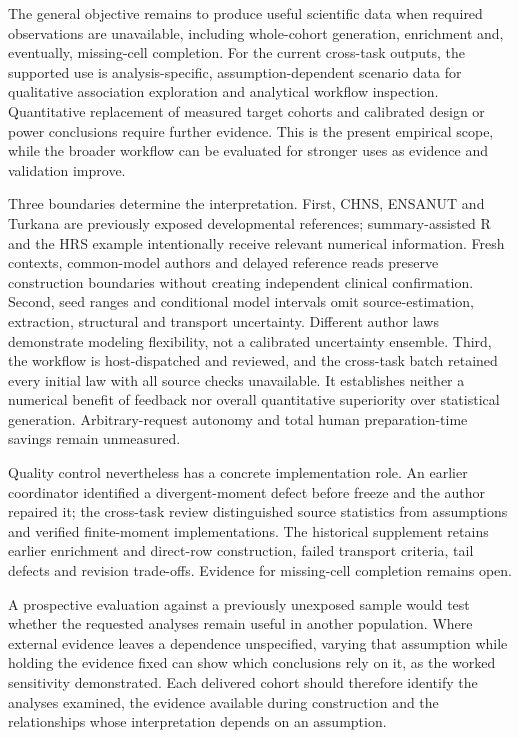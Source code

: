 \documentclass[10pt,twocolumn]{article}
\begin{document}
The general objective remains to produce useful scientific data when required observations are unavailable, including whole-cohort generation, enrichment and, eventually, missing-cell completion. For the current cross-task outputs, the supported use is analysis-specific, assumption-dependent scenario data for qualitative association exploration and analytical workflow inspection. Quantitative replacement of measured target cohorts and calibrated design or power conclusions require further evidence. This is the present empirical scope, while the broader workflow can be evaluated for stronger uses as evidence and validation improve.


Three boundaries determine the interpretation. First, CHNS, ENSANUT and Turkana are previously exposed developmental references; summary-assisted R and the HRS example intentionally receive relevant numerical information. Fresh contexts, common-model authors and delayed reference reads preserve construction boundaries without creating independent clinical confirmation. Second, seed ranges and conditional model intervals omit source-estimation, extraction, structural and transport uncertainty. Different author laws demonstrate modeling flexibility, not a calibrated uncertainty ensemble. Third, the workflow is host-dispatched and reviewed, and the cross-task batch retained every initial law with all source checks unavailable. It establishes neither a numerical benefit of feedback nor overall quantitative superiority over statistical generation. Arbitrary-request autonomy and total human preparation-time savings remain unmeasured.


Quality control nevertheless has a concrete implementation role. An earlier coordinator identified a divergent-moment defect before freeze and the author repaired it; the cross-task review distinguished source statistics from assumptions and verified finite-moment implementations. The historical supplement retains earlier enrichment and direct-row construction, failed transport criteria, tail defects and revision trade-offs. Evidence for missing-cell completion remains open.


A prospective evaluation against a previously unexposed sample would test whether the requested analyses remain useful in another population. Where external evidence leaves a dependence unspecified, varying that assumption while holding the evidence fixed can show which conclusions rely on it, as the worked sensitivity demonstrated. Each delivered cohort should therefore identify the analyses examined, the evidence available during construction and the relationships whose interpretation depends on an assumption.
\end{document}
